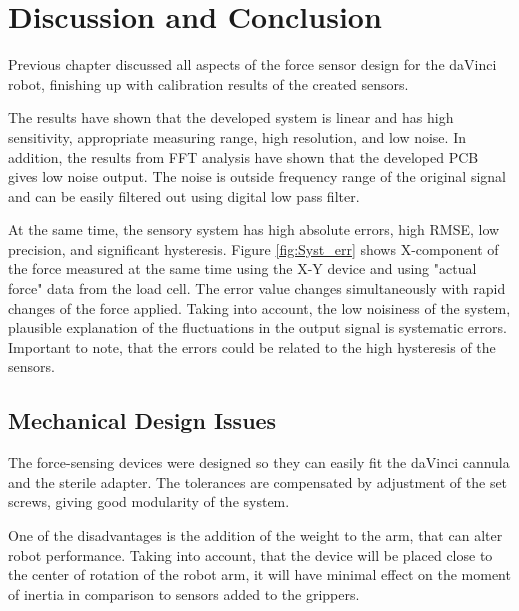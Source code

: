 \chapter{Discussion and Conclusion}
\label{discuss} %
Previous chapter discussed all aspects of the force sensor design for the daVinci robot, finishing up with calibration results of the created sensors. 

The results have shown that the developed system is linear and has high sensitivity, appropriate measuring range, high resolution, and low noise. In addition, the results from FFT analysis have shown that the developed PCB gives low noise output. The noise is outside frequency range of the original signal and can be easily filtered out using digital low pass filter.

At the same time, the sensory system has high absolute errors, high RMSE, low precision, and significant hysteresis. Figure \ref{fig:Syst_err} shows X-component of the force measured at the same time using the X-Y device and using "actual force" data from the load cell. The error value changes simultaneously with rapid changes of the force applied. Taking into account, the low noisiness of the system, plausible explanation of the fluctuations in the output signal is systematic errors. Important to note, that the errors could be related to the high hysteresis of the sensors.

\section{Mechanical Design Issues}

The force-sensing devices were designed so they can easily fit the daVinci cannula and the sterile adapter. The tolerances are compensated by adjustment of the set screws, giving good modularity of the system.

One of the disadvantages is the addition of the weight to the arm, that can alter robot performance. Taking into account, that the device will be placed close to the center of rotation of the robot arm, it will have minimal effect on the moment of inertia in comparison to sensors added to the grippers.

